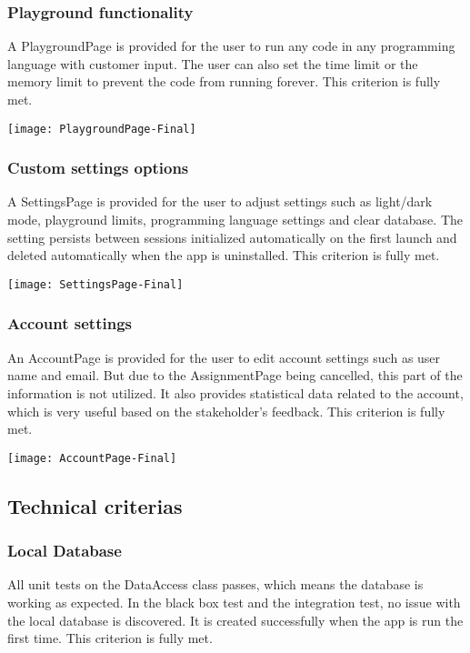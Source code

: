 \documentclass[report.tex]{subfiles}
\begin{document}
\subsubsection{Playground functionality}

A PlaygroundPage is provided for the user to run any code in any programming language with customer input. The user can also set the time limit or the memory limit to prevent the code from running forever. This criterion is fully met.

\texttt{[image: PlaygroundPage-Final]}

\subsubsection{Custom settings options}

A SettingsPage is provided for the user to adjust settings such as light/dark mode, playground limits, programming language settings and clear database. The setting persists between sessions initialized automatically on the first launch and deleted automatically when the app is uninstalled. This criterion is fully met.

\texttt{[image: SettingsPage-Final]}

\subsubsection{Account settings}

An AccountPage is provided for the user to edit account settings such as user name and email. But due to the AssignmentPage being cancelled, this part of the information is not utilized. It also provides statistical data related to the account, which is very useful based on the stakeholder's feedback. This criterion is fully met.

\texttt{[image: AccountPage-Final]}

\subsection{Technical criterias}

\subsubsection{Local Database}

All unit tests on the DataAccess class passes, which means the database is working as expected. In the black box test and the integration test, no issue with the local database is discovered. It is created successfully when the app is run the first time. This criterion is fully met.
\end{document}
